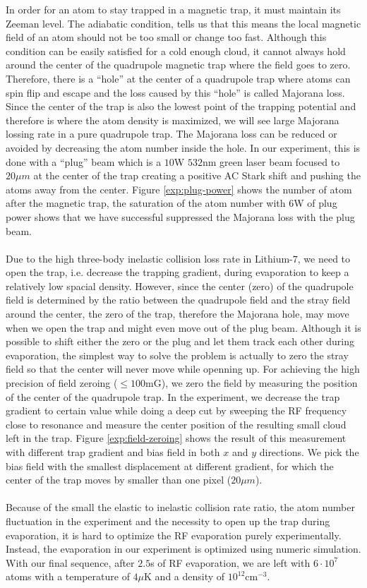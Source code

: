 In order for an atom to stay trapped in a magnetic trap, it must maintain its Zeeman level. The adiabatic condition, tells us that this means the local magnetic field of an atom should not be too small or change too fast. Although this condition can be easily satisfied for a cold enough cloud, it cannot always hold around the center of the quadrupole magnetic trap where the field goes to zero. Therefore, there is a ``hole'' at the center of a quadrupole trap where atoms can spin flip and escape and the loss caused by this ``hole'' is called Majorana loss. Since the center of the trap is also the lowest point of the trapping potential and therefore is where the atom density is maximized, we will see large Majorana lossing rate in a pure quadrupole trap. The Majorana loss can be reduced or avoided by decreasing the atom number inside the hole. In our experiment, this is done with a ``plug'' beam which is a $10$W $532$nm green laser beam focused to $20\mu m$ at the center of the trap creating a positive AC Stark shift and pushing the atoms away from the center. Figure \ref{exp:plug-power} shows the number of atom after the magnetic trap, the saturation of the atom number with $6$W of plug power shows that we have successful suppressed the Majorana loss with the plug beam.\\
\\
Due to the high three-body inelastic collision loss rate in Lithium-$7$, we need to open the trap, i.e. decrease the trapping gradient, during evaporation to keep a relatively low spacial density. However, since the center (zero) of the quadrupole field is determined by the ratio between the quadrupole field and the stray field around the center, the zero of the trap, therefore the Majorana hole, may move when we open the trap and might even move out of the plug beam. Although it is possible to shift either the zero or the plug and let them track each other during evaporation, the simplest way to solve the problem is actually to zero the stray field so that the center will never move while openning up. For achieving the high precision of field zeroing ($\leqslant100\text{mG}$), we zero the field by measuring the position of the center of the quadrupole trap. In the experiment, we decrease the trap gradient to certain value while doing a deep cut by sweeping the RF frequency close to resonance and measure the center position of the resulting small cloud left in the trap. Figure \ref{exp:field-zeroing} shows the result of this measurement with different trap gradient and bias field in both $x$ and $y$ directions. We pick the bias field with the smallest displacement at different gradient, for which the center of the trap moves by smaller than one pixel ($20\mu m$).\\
\\
Because of the small the elastic to inelastic collision rate ratio, the atom number fluctuation in the experiment and the necessity to open up the trap during evaporation, it is hard to optimize the RF evaporation purely experimentally. Instead, the evaporation in our experiment is optimized using numeric simulation. With our final sequence, after $2.5$s of RF evaporation, we are left with $6\cdot10^7$ atoms with a temperature of $4\mu$K and a density of $10^{12}\text{cm}^{-3}$.

